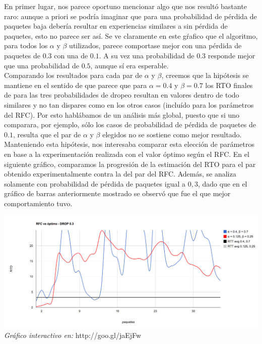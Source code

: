\indent En primer lugar,  nos parece oportuno mencionar algo que nos resultó bastante raro: aunque a priori se podría imaginar que para una probabilidad de pérdida de paquetes baja debería resultar en experiencias similares a sin pérdida de paquetes, esto no parece ser así. Se ve claramente en este gŕafico que el algoritmo, para todos los $\alpha$ y $\beta$ utilizados, parece comportase mejor con una pérdida de paquetes de $0.3$ con una de $0.1$. A su vez una probabilidad de $0.3$ responde mejor que una probabilidad de $0.5$, aunque sí era esperable.\\
\indent Comparando los resultados para cada par de $\alpha$ y $\beta$, creemos que la hipótesis se mantiene en el sentido de que parece que para $\alpha = 0.4$ y $\beta = 0.7$ los RTO finales de para las tres probabilidades de dropeo resultan en valores dentro de todo similares y no tan dispares como en los otros casos (incluído para los parámetros del RFC). Por esto hablábamos de un análisis más global, puesto que si uno comparara, por ejemplo, sólo los casos de probabilidad de pérdida de paquetes de $0.1$, resulta que el par de $\alpha$ y $\beta$ elegidos no se sostiene como mejor resultado. \\ 

\indent Manteniendo esta hipótesis, nos interesaba comparar esta elección de parámetros en base a la experimentación realizada con el valor óptimo según el RFC. En el siguiente gráfico, comparamos la progresión de la estimación del RTO para el par obtenido experimentalmente contra la del par del RFC. Además, se analiza solamente con probabilidad de pérdida de paquetes igual a $0,3$, dado que en el gráfico de barras anteriormente mostrado se observó que fue el que mejor comportamiento tuvo.\\

\begin{center}
	\includegraphics[scale=0.35]{graphics/rfc_vs_optimo.png}
	\textit{Gráfico interactivo en:} http://goo.gl/jaEjFw
\end{center}

